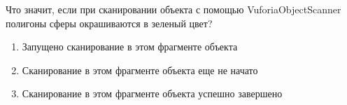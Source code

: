 
Что значит, если при сканировании объекта с помощью VuforiaObjectScanner полигоны сферы окрашиваются в зеленый цвет?

\begin{enumerate}
    \item Запущено сканирование в этом фрагменте объекта
    \item Сканирование в этом фрагменте объекта еще не начато
    \item Сканирование в этом фрагменте объекта успешно завершено
\end{enumerate}